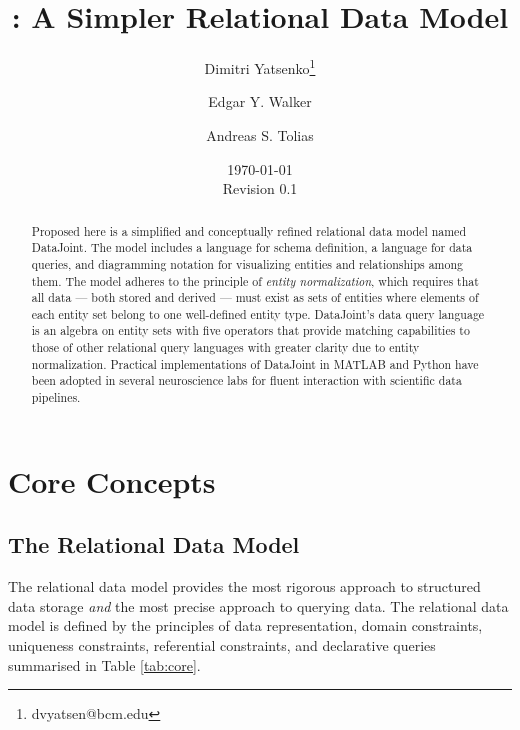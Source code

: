\documentclass[letter,10pt]{article}
\author[1,2]{Dimitri Yatsenko\thanks{dvyatsen@bcm.edu}}
\author[1,2]{Edgar Y. Walker}
\author[1,2]{Andreas S. Tolias}
\affil[1]{Department of Neuroscience, Baylor College of Medicine, Houston, Texas, USA}
\affil[2]{Vathes LLC, Houston, Texas, USA}
\date{\today\\Revision 0.1}
\title{\datajoint: A Simpler Relational Data Model}
\newcommand{\datajoint}{DataJoint\xspace}
\begin{document}
\maketitle
\begin{abstract}
Proposed here is a simplified and conceptually refined relational data model named \datajoint. 
The model includes a language for schema definition, a language for data queries, and diagramming notation for visualizing entities and relationships among them.  
The model adheres to the principle of \emph{entity normalization}, which requires that all data --- both stored and derived --- must exist as sets of entities where elements of each entity set belong to one well-defined entity type.
\datajoint's data query language is an algebra on entity sets with five operators that provide matching capabilities to those of other relational query languages with greater clarity due to entity normalization. 
Practical implementations of \datajoint in MATLAB and Python have been adopted in several neuroscience labs for fluent interaction with scientific data pipelines.
\end{abstract}
\tableofcontents 

\twocolumn

\section{Core Concepts}
\subsection{The Relational Data Model}
The relational data model \citep{codd_relational_1970} provides the most rigorous approach to structured data storage \emph{and} the most precise approach to querying data.  
The relational data model is defined by the principles of data representation, domain constraints, uniqueness constraints, referential constraints, and declarative queries summarised in Table \ref{tab:core}.
\end{document}
